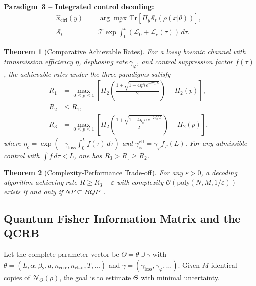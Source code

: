 \documentclass[journal,twocolumn]{IEEEtran}
\theoremstyle{definition}
\theoremstyle{plain}
\newtheorem{theorem}{Theorem}[section]
\newcommand{\Tr}{\mathrm{Tr}}
\begin{document}
\medskip\noindent\textbf{Paradigm~3 -- Integrated control decoding:}
\begin{align}
  \hat x_{\mathrm{ctrl}}(y) &= \arg\max_x\,
    \Tr[\Pi_y \mathcal{S}_t(\rho(x|\theta))], \nonumber\\
  \mathcal{S}_t &= \mathcal{T}\!\exp\!\int_0^t
    (\mathcal{L}_0 + \mathcal{L}_c(\tau))\,d\tau.
  \label{eq:paradigm3}
\end{align}

\begin{theorem}[Comparative Achievable Rates]
\label{thm:comparative}
For a lossy bosonic channel with transmission efficiency $\eta$,
dephasing rate $\gamma_\varphi$, and control suppression factor
$f(\tau)$, the achievable rates under the three paradigms satisfy
\begin{align}
  R_1 &= \max_{0 \le p \le 1}\!\left[
    H_2\!\left(\frac{1+\sqrt{1 - 4\eta\bar n\,
      e^{-2\gamma_\varphi L}}}{2}\right) - H_2(p)\right],
    \nonumber\\
  R_2 &\le R_1, \nonumber\\
  R_3 &= \max_{0\le p\le1}\!\left[
    H_2\!\left(\frac{1+\sqrt{1 - 4\eta_c\bar n\,
      e^{-2\gamma_\varphi^{\mathrm{eff}}L}}}{2}\right)
    - H_2(p)\right],
  \label{eq:rates}
\end{align}
where $\eta_c = \exp(-\gamma_{\mathrm{loss}}\int_0^L f(\tau)\,d\tau)$
and $\gamma_\varphi^{\mathrm{eff}} = \gamma_\varphi f_\varphi(L)$.
For any admissible control with $\int f\, d\tau < L$, one has
$R_3 > R_1 \ge R_2$.
\end{theorem}

\begin{theorem}[Complexity-Performance Trade-off]
\label{thm:complexity}
For any $\varepsilon > 0$, a decoding algorithm achieving rate
$R \ge R_3 - \varepsilon$ with complexity
$\mathcal{O}(\mathrm{poly}(N, M, 1/\varepsilon))$ exists if and
only if $NP \subseteq BQP$~\cite{aaronson2005}.
\end{theorem}

\subsection{Quantum Fisher Information Matrix and the QCRB}

Let the complete parameter vector be $\Theta = \theta \cup \gamma$
with $\theta = (L,\alpha,\beta_2,a,n_{\mathrm{core}},
n_{\mathrm{clad}},T,\ldots)$ and $\gamma = (\gamma_{\mathrm{loss}},
\gamma_\varphi, \ldots)$.  Given $M$ identical copies of
$\mathcal{N}_\Theta(\rho)$, the goal is to estimate $\Theta$ with
minimal uncertainty.
\end{document}
